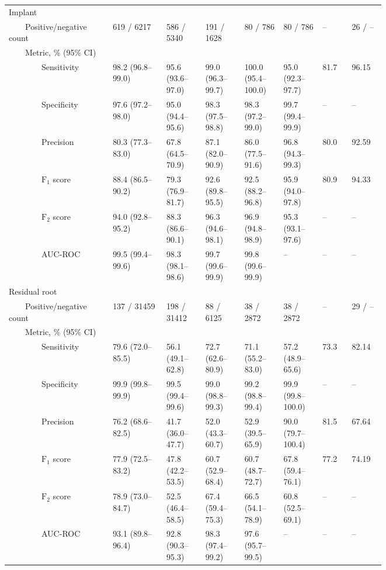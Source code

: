 \begin{table}[!h]
\begin{tabular}{ p{0.167\linewidth}p{0.117\linewidth}p{0.083\linewidth}p{0.083\linewidth}p{0.083\linewidth}p{0.083\linewidth}|p{0.067\linewidth}p{0.067\linewidth} }
Implant &   &   &   &   &   &   &   \\
{~~~~}Positive/negative count & \num{619} / \num{6217} & \num{586} / \num{5340} & \num{191} / \num{1628} & \num{80} / \num{786} & \num{80} / \num{786} & -- & \num{26} / -- \\
{~~~~}Metric, \% (95\% CI) &   &   &   &   &   &   &   \\
{~~~~~~~~}Sensitivity & 98.2 {(96.8--99.0)} & 95.6 {(93.6--97.0)} & 99.0 {(96.3--99.7)} & 100.0 {(95.4--100.0)} & 95.0 {(92.3--97.7)} & 81.7 & 96.15 \\
{~~~~~~~~}Specificity & 97.6 {(97.2--98.0)} & 95.0 {(94.4--95.6)} & 98.3 {(97.5--98.8)} & 98.3 {(97.2--99.0)} & 99.7 {(99.4--99.9)} & -- & -- \\
{~~~~~~~~}Precision & 80.3 {(77.3--83.0)} & 67.8 {(64.5--70.9)} & 87.1 {(82.0--90.9)} & 86.0 {(77.5--91.6)} & 96.8 {(94.3--99.3)} & 80.0 & 92.59 \\
{~~~~~~~~}$\textrm{F}_1$ score & 88.4 {(86.5--90.2)} & 79.3 {(76.9--81.7)} & 92.6 {(89.8--95.5)} & 92.5 {(88.2--96.8)} & 95.9 {(94.0--97.8)} & 80.9 & 94.33 \\
{~~~~~~~~}$\textrm{F}_2$ score & 94.0 {(92.8--95.2)} & 88.3 {(86.6--90.1)} & 96.3 {(94.6--98.1)} & 96.9 {(94.8--98.9)} & 95.3 {(93.1--97.6)} & -- & -- \\
{~~~~~~~~}AUC-ROC & 99.5 {(99.4--99.6)} & 98.3 {(98.1--98.6)} & 99.7 {(99.6--99.9)} & 99.8 {(99.6--99.9)} & -- & -- & -- \\ \midrule
 
Residual root &   &   &   &   &   &   &   \\
{~~~~}Positive/negative count & \num{137} / \num{31459} & \num{198} / \num{31412} & \num{88} / \num{6125} & \num{38} / \num{2872} & \num{38} / \num{2872} & -- & \num{29} / -- \\
{~~~~}Metric, \% (95\% CI) &   &   &   &   &   &   &   \\
{~~~~~~~~}Sensitivity & 79.6 {(72.0--85.5)} & 56.1 {(49.1--62.8)} & 72.7 {(62.6--80.9)} & 71.1 {(55.2--83.0)} & 57.2 {(48.9--65.6)} & 73.3 & 82.14 \\
{~~~~~~~~}Specificity & 99.9 {(99.8--99.9)} & 99.5 {(99.4--99.6)} & 99.0 {(98.8--99.3)} & 99.2 {(98.8--99.4)} & 99.9 {(99.8--100.0)} & -- & -- \\
{~~~~~~~~}Precision & 76.2 {(68.6--82.5)} & 41.7 {(36.0--47.7)} & 52.0 {(43.3--60.7)} & 52.9 {(39.5--65.9)} & 90.0 {(79.7--100.4)} & 81.5 & 67.64 \\
{~~~~~~~~}$\textrm{F}_1$ score & 77.9 {(72.5--83.2)} & 47.8 {(42.2--53.5)} & 60.7 {(52.9--68.4)} & 60.7 {(48.7--72.7)} & 67.8 {(59.4--76.1)} & 77.2 & 74.19 \\
{~~~~~~~~}$\textrm{F}_2$ score & 78.9 {(73.0--84.7)} & 52.5 {(46.4--58.5)} & 67.4 {(59.4--75.3)} & 66.5 {(54.1--78.9)} & 60.8 {(52.5--69.1)} & -- & -- \\
{~~~~~~~~}AUC-ROC & 93.1 {(89.8--96.4)} & 92.8 {(90.3--95.3)} & 98.3 {(97.4--99.2)} & 97.6 {(95.7--99.5)} & -- & -- & -- \\ \midrule


\end{tabular}
\end{table}
